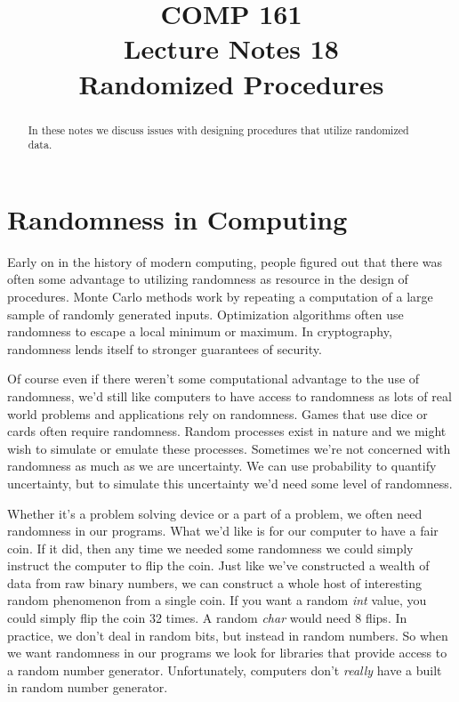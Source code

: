 \documentclass[]{tufte-handout}
\title{COMP 161 \\ Lecture Notes 18 \\ Randomized Procedures}
\begin{document}
\maketitle

\begin{abstract}
In these notes we discuss issues with designing procedures that utilize randomized data.
\end{abstract}


\section{Randomness in Computing}

Early on in the history of modern computing, people figured out that there was often some advantage to utilizing randomness as resource in the design of procedures.  Monte Carlo methods work by repeating a computation of a large sample of randomly generated inputs. Optimization algorithms often use randomness to escape a local minimum or maximum.  In cryptography, randomness lends itself to stronger guarantees of security.

Of course even if there weren't some computational advantage to the use of randomness, we'd still like computers to have access to randomness as lots of real world problems and applications rely on randomness. Games that use dice or cards often require randomness. Random processes exist in nature and we might wish to simulate or emulate these processes.  Sometimes we're not concerned with randomness as much as we are uncertainty. We can use probability to quantify uncertainty, but to simulate this uncertainty we'd need some level of randomness.

Whether it's a problem solving device or a part of a problem, we often need randomness in our programs. What we'd like is for our computer to have a fair coin. If it did, then any time we needed some randomness we could simply instruct the computer to flip the coin.  Just like we've constructed a wealth of data from raw binary numbers, we can construct a whole host of interesting random phenomenon  from a single coin. If you want a random \textit{int} value, you could simply flip the coin 32 times. A random \textit{char} would need 8 flips.  In practice, we don't deal in random bits, but instead in random numbers.  So when we want randomness in our programs we look for libraries that provide access to a random number generator.  Unfortunately, computers don't \textit{really} have a built in random number generator.
\end{document}
